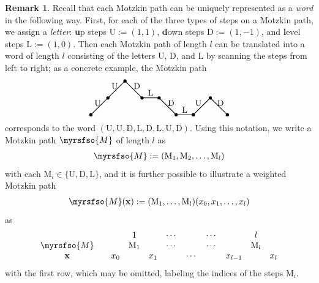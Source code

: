 \documentclass[12pt,reqno]{amsart}
\numberwithin{equation}{section}
\theoremstyle{theorem}
\theoremstyle{definition}
\newtheorem{remark}[theorem]{Remark}
\theoremstyle{named}
\newcommand{\cM}{\myrsfso{M}}
\newcommand{\bfx}{\mathbf{x}}
\newcommand{\rmM}{\mathrm{M}}
\newcommand{\rU}{\mathrm{U}}
\newcommand{\rD}{\mathrm{D}}
\newcommand{\rL}{\mathrm{L}}
\begin{document}
\begin{remark}\label{rmk:Motz-word}
	Recall that each Motzkin path can be uniquely represented as a \emph{word} in the following way. First, for each of the three types of steps on a Motzkin path, we assign a \emph{letter}: \textbf{u}p steps $\rU:=(1,1)$, \textbf{d}own steps $\rD:=(1,-1)$, and \textbf{l}evel steps $\rL:=(1,0)$. Then each Motzkin path of length $l$ can be translated into a word of length $l$ consisting of the letters $\rU$, $\rD$, and $\rL$ by scanning the steps from left to right; as a concrete example, the Motzkin path
	\begin{align*}
		\vcenter{\hbox{\begin{tikzpicture}[line width=0.8pt,scale=0.7]
					\coordinate (O) at (0,0);
					\draw[thick] (O)--++(1,1)--++(1,1)--++(1,-1)--++(1,0)--++(1,-1)--++(1,0)--++(1,1)--++(1,-1);
					\filldraw (O) circle(0.5ex) ++(1,1)circle(0.5ex) ++(1,1)circle(0.5ex) ++(1,-1)circle(0.5ex)
					++(1,0)circle(0.5ex) ++(1,-1)circle(0.5ex) ++(1,0)circle(0.5ex) ++(1,1)circle(0.5ex) ++(1,-1)circle(0.5ex);
					\path (0.4,0.7) node {$\rU$} ++(1,1) node {$\rU$} ++(1.3,0) node {$\rD$} ++(0.8,-0.4) node {$\rL$} ++(1.2,-0.6) node {$\rD$} ++(0.8,-0.4) node {$\rL$} ++(0.8,0.4) node {$\rU$} ++(1.3,0) node {$\rD$};
		\end{tikzpicture}}}
	\end{align*}
	corresponds to the word $(\rU, \rU, \rD, \rL, \rD, \rL, \rU, \rD)$. Using this notation, we write a Motzkin path $\cM$ of length $l$ as
	\begin{align*}
		\cM := (\rmM_1,\rmM_2,\ldots,\rmM_l)
	\end{align*}
	with each $\rmM_i \in \{\rU,\rD,\rL\}$, and it is further possible to illustrate a weighted Motzkin path
	\begin{align*}
		\cM(\bfx) := (\rmM_1,\ldots,\rmM_l)(x_0,x_1,\ldots,x_l)
	\end{align*}
	as
	\begin{align}\label{eq:weighted-Motz-word}
		\begin{array}{ccccccccccc}
			& & & 1 & & \cdots & & \cdots & & l\\
			\cM & & & \rmM_1 & & \cdots & & \cdots & & \rmM_l\\
			\bfx & & x_0 & & x_1 & & \cdots & & x_{l-1} & & x_l
		\end{array}
	\end{align}
	with the first row, which may be omitted, labeling the indices of the steps $\rmM_i$.
\end{remark}
\end{document}
